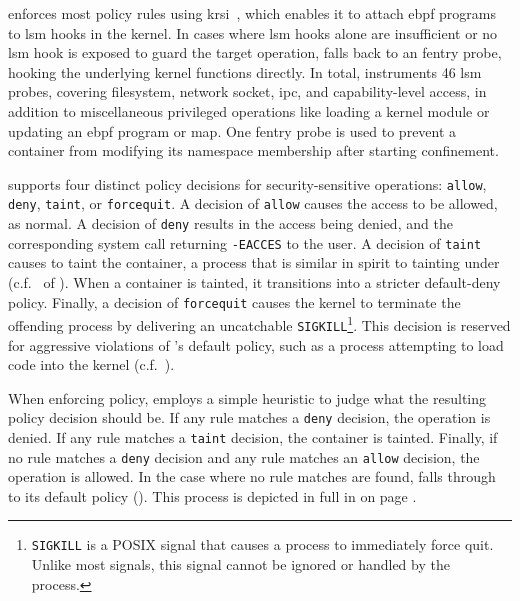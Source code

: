 \bpfcontain{} enforces most policy rules using \gls{krsi}~\cite{singh2019_krsi}, which
enables it to attach \gls{ebpf} programs to \gls{lsm} hooks in the kernel. In cases where
\gls{lsm} hooks alone are insufficient or no \gls{lsm} hook is exposed to guard the target
operation, \bpfcontain{} falls back to an fentry probe, hooking the underlying kernel
functions directly. In total, \bpfcontain{} instruments 46 \gls{lsm} probes, covering
filesystem, network socket, \gls{ipc}, and capability-level access, in addition to
miscellaneous privileged operations like loading a kernel module or updating an \gls{ebpf}
program or map. One fentry probe is used to prevent a container from modifying its
namespace membership after starting confinement.

\bpfcontain{} supports four distinct policy decisions for security-sensitive operations:
\texttt{allow}, \texttt{deny}, \texttt{taint}, or \texttt{forcequit}. A decision of
\texttt{allow} causes the access to be allowed, as normal. A decision of \texttt{deny}
results in the access being denied, and the corresponding system call returning
\texttt{-EACCES} to the user. A decision of \texttt{taint} causes \bpfcontain{} to taint
the container, a process that is similar in spirit to tainting under \bpfbox{}
(c.f.\  of ). When a container is tainted, it
transitions into a stricter default-deny policy. Finally, a decision of \texttt{forcequit}
causes the kernel to terminate the offending process by delivering an uncatchable
\texttt{SIGKILL}\footnote{\texttt{SIGKILL} is a POSIX signal that causes a process to
immediately force quit. Unlike most signals, this signal cannot be ignored or handled by
the process.}. This decision is reserved for aggressive violations of \bpfcontain{}'s
default policy, such as a process attempting to load code into the kernel
(c.f.\ ).

When enforcing policy, \bpfcontain{} employs a simple heuristic to judge what the
resulting policy decision should be. If any rule matches a \texttt{deny} decision, the
operation is denied. If any rule matches a \texttt{taint} decision, the container is
tainted.  Finally, if no rule matches a \texttt{deny} decision and any rule matches an
\texttt{allow} decision, the operation is allowed. In the case where no rule matches are
found, \bpfcontain{} falls through to its default policy ().
This process is depicted in full in  on page
\pageref{fig:bpfcontain-enforcement}.

